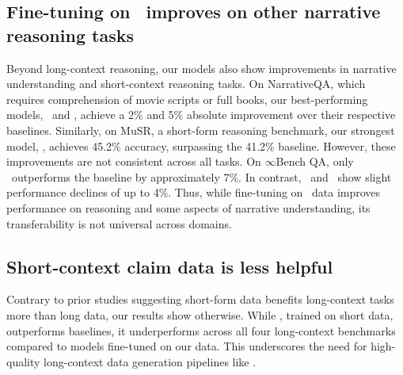 \subsection{Fine-tuning on \pipeline\ improves on other narrative reasoning tasks}  Beyond long-context reasoning, our models also show improvements in narrative understanding and short-context reasoning tasks. On NarrativeQA, which requires comprehension of movie scripts or full books, our best-performing models, \llamaftbalanced\ and \prolongftbalanced, achieve a 2\% and 5\% absolute improvement over their respective baselines. Similarly, on MuSR, a short-form reasoning benchmark, our strongest model, \qwenft, achieves 45.2\% accuracy, surpassing the 41.2\% baseline. However, these improvements are not consistent across all tasks. On $\infty$Bench QA, only \qwenftbalanced\ outperforms the baseline by approximately 7\%. In contrast, \llamaftbalanced\ and \prolongftbalanced\ show slight performance declines of up to 4\%. Thus, while fine-tuning on \pipeline\ data improves performance on reasoning and some aspects of narrative understanding, its transferability is not universal across domains.


\subsection{Short-context claim data is less helpful}
Contrary to prior studies suggesting short-form data benefits long-context tasks \cite{dubey2024llama, gao2024trainlongcontextlanguagemodels} more than long data, our results show otherwise. While \prolongwp, trained on short data, outperforms baselines, it underperforms across all four long-context benchmarks compared to models fine-tuned on our data. This underscores the need for high-quality long-context data generation pipelines like \pipeline.

